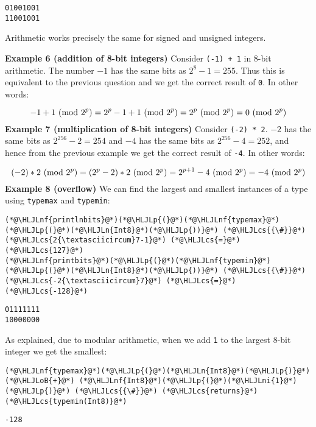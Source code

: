 \documentclass[12pt,a4paper]{article}
\newcommand{\HLJLn}[1]{#1}
\newcommand{\HLJLnf}[1]{\textcolor[RGB]{66,102,213}{#1}}
\newcommand{\HLJLni}[1]{\textcolor[RGB]{59,151,46}{#1}}
\newcommand{\HLJLoB}[1]{\textcolor[RGB]{102,102,102}{\textbf{#1}}}
\newcommand{\HLJLp}[1]{#1}
\newcommand{\HLJLcs}[1]{\textcolor[RGB]{153,153,119}{\textit{#1}}}
\begin{document}
\begin{lstlisting}
01001001
11001001
\end{lstlisting}


Arithmetic works precisely the same for signed and unsigned integers.

\textbf{Example 6 (addition of 8-bit integers)} Consider \texttt{(-1) + 1} in 8-bit arithmetic. The number $-1$ has the same bits as $2^8 - 1 = 255$. Thus this is equivalent to the previous question and we get the correct result of \texttt{0}. In other words:

\[
-1 + 1 \ ({\rm mod}\ 2^p) = 2^p-1  + 1 \ ({\rm mod}\ 2^p) = 2^p \ ({\rm mod}\ 2^p) = 0 \ ({\rm mod}\ 2^p)
\]
\textbf{Example 7 (multiplication of 8-bit integers)} Consider \texttt{(-2) * 2}. $-2$ has the same bits as $2^{256} - 2 = 254$ and $-4$ has the same bits as $2^{256}-4 = 252$, and hence from the previous example we get the correct result of \texttt{-4}. In other words:

\[
(-2) * 2 \ ({\rm mod}\ 2^p) = (2^p-2) * 2 \ ({\rm mod}\ 2^p) = 2^{p+1}-4 \ ({\rm mod}\ 2^p) = -4 \ ({\rm mod}\ 2^p)
\]
\textbf{Example 8 (overflow)} We can find the largest and smallest instances of a type using \texttt{typemax} and \texttt{typemin}:


\begin{lstlisting}
(*@\HLJLnf{printlnbits}@*)(*@\HLJLp{(}@*)(*@\HLJLnf{typemax}@*)(*@\HLJLp{(}@*)(*@\HLJLn{Int8}@*)(*@\HLJLp{))}@*) (*@\HLJLcs{{\#}}@*) (*@\HLJLcs{2{\textasciicircum}7-1}@*) (*@\HLJLcs{=}@*) (*@\HLJLcs{127}@*)
(*@\HLJLnf{printbits}@*)(*@\HLJLp{(}@*)(*@\HLJLnf{typemin}@*)(*@\HLJLp{(}@*)(*@\HLJLn{Int8}@*)(*@\HLJLp{))}@*) (*@\HLJLcs{{\#}}@*) (*@\HLJLcs{-2{\textasciicircum}7}@*) (*@\HLJLcs{=}@*) (*@\HLJLcs{-128}@*)
\end{lstlisting}

\begin{lstlisting}
01111111
10000000
\end{lstlisting}


As explained, due to modular arithmetic, when we add \texttt{1} to the largest 8-bit integer we get the smallest:


\begin{lstlisting}
(*@\HLJLnf{typemax}@*)(*@\HLJLp{(}@*)(*@\HLJLn{Int8}@*)(*@\HLJLp{)}@*) (*@\HLJLoB{+}@*) (*@\HLJLnf{Int8}@*)(*@\HLJLp{(}@*)(*@\HLJLni{1}@*)(*@\HLJLp{)}@*) (*@\HLJLcs{{\#}}@*) (*@\HLJLcs{returns}@*) (*@\HLJLcs{typemin(Int8)}@*)
\end{lstlisting}

\begin{lstlisting}
-128
\end{lstlisting}
\end{document}

